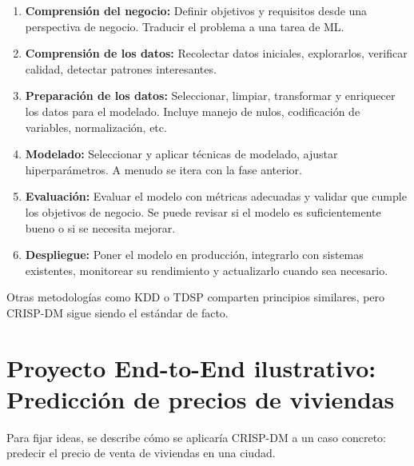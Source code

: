 \documentclass[12pt,a4paper,openany,oneside]{book}
\begin{document}
\begin{enumerate}
    \item \textbf{Comprensión del negocio:} Definir objetivos y requisitos desde una perspectiva de negocio. Traducir el problema a una tarea de ML.
    \item \textbf{Comprensión de los datos:} Recolectar datos iniciales, explorarlos, verificar calidad, detectar patrones interesantes.
    \item \textbf{Preparación de los datos:} Seleccionar, limpiar, transformar y enriquecer los datos para el modelado. Incluye manejo de nulos, codificación de variables, normalización, etc.
    \item \textbf{Modelado:} Seleccionar y aplicar técnicas de modelado, ajustar hiperparámetros. A menudo se itera con la fase anterior.
    \item \textbf{Evaluación:} Evaluar el modelo con métricas adecuadas y validar que cumple los objetivos de negocio. Se puede revisar si el modelo es suficientemente bueno o si se necesita mejorar.
    \item \textbf{Despliegue:} Poner el modelo en producción, integrarlo con sistemas existentes, monitorear su rendimiento y actualizarlo cuando sea necesario.
\end{enumerate}

Otras metodologías como KDD o TDSP comparten principios similares, pero CRISP-DM sigue siendo el estándar de facto.

\section{Proyecto End-to-End ilustrativo: Predicción de precios de viviendas}
Para fijar ideas, se describe cómo se aplicaría CRISP-DM a un caso concreto: predecir el precio de venta de viviendas en una ciudad.
\end{document}
